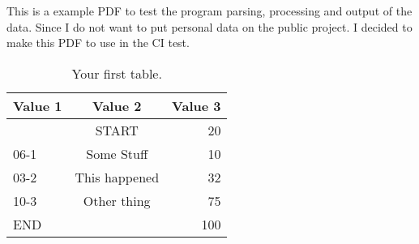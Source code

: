 \documentclass{article}
\begin{document}
This is a example PDF to test the program parsing, processing and output of the data.
Since I do not want to put personal data on the public project. I decided to make this PDF to use in the CI test.

\begin{table}
    \caption{Your first table.}
    \label{tab:table1}
    \begin{tabular}{|l c r|} %
      \textbf{Value 1} & \textbf{Value 2} & \textbf{Value 3}\\
      \hline
           & START         & 20\\
      06-1 & Some Stuff    & 10\\
      03-2 & This happened & 32\\
      10-3 & Other thing   & 75\\
      END  &               & 100\\
    \end{tabular}
\end{table}
\end{document}

